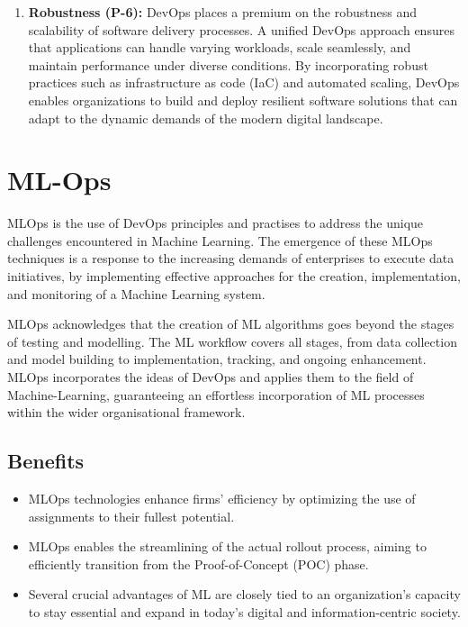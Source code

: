\documentclass[12pt, letterpaper]{article}
\begin{document}
\begin{enumerate}
    \item \textbf{Robustness (P-6):} 
    DevOps places a premium on the robustness and scalability of software delivery processes. A unified DevOps approach ensures that applications can handle varying workloads, scale seamlessly, and maintain performance under diverse conditions. By incorporating robust practices such as infrastructure as code (IaC) and automated scaling, DevOps enables organizations to build and deploy resilient software solutions that can adapt to the dynamic demands of the modern digital landscape.

\end{enumerate}


\section{ML-Ops}
MLOps is the use of DevOps principles and practises to address the unique challenges encountered in Machine Learning.
The emergence of these MLOps techniques is a response to the increasing demands of enterprises to execute data initiatives, by implementing effective approaches for the creation, implementation, and monitoring of a Machine Learning system\cite{mathew2014overview}.

MLOps acknowledges that the creation of ML algorithms goes beyond the stages of testing and modelling.  The ML workflow covers all stages, from data collection and model building to implementation, tracking, and ongoing enhancement.  MLOps incorporates the ideas of DevOps and applies them to the field of Machine-Learning, guaranteeing an effortless incorporation of ML processes within the wider organisational framework\cite{hamunen2016challenges}.


\subsection{Benefits}
\begin{itemize}
    \item MLOps technologies enhance firms' efficiency by optimizing the use of assignments to their fullest potential.
    \item MLOps enables the streamlining of the actual rollout process, aiming to efficiently transition from the Proof-of-Concept (POC) phase.
    \item Several crucial advantages of ML are closely tied to an organization's capacity to stay essential and expand in today's digital and information-centric society.
\end{itemize}
\end{document}
